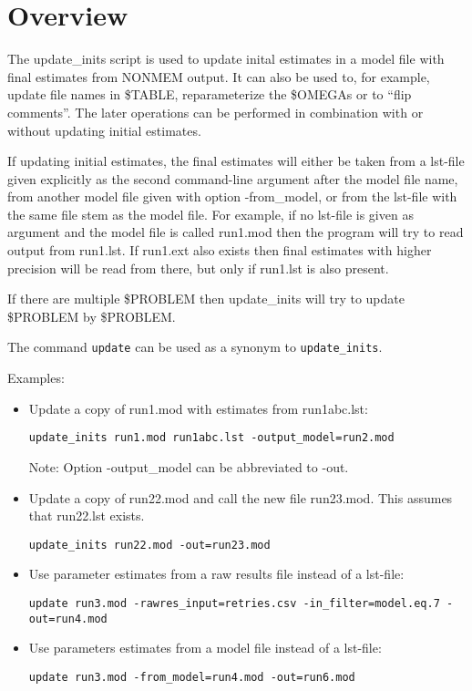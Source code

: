 
\setlength{\evensidemargin}{0pt}
\setlength{\oddsidemargin}{0pt}




\maketitle


\section{Overview}
The update\_inits script is used to update inital estimates in a model file with final
estimates from NONMEM output. It can also be used to, for example, update file names in \$TABLE, reparameterize
the \$OMEGAs or to ``flip comments''. The later operations can be performed in combination with 
or without updating initial estimates.

If updating initial estimates, the final estimates will either be taken from a lst-file given explicitly as the second 
command-line argument after the model file name, from another model file given with option -from\_model, 
or from the lst-file with the same file stem as the model file.
For example, if no lst-file is given as argument and the model file is called run1.mod then the program will try to read output from
run1.lst. If run1.ext also exists then final estimates with higher precision will be read from there, 
but only if run1.lst is also present.

If there are multiple \$PROBLEM then update\_inits will try to update \$PROBLEM by \$PROBLEM.

The command \verb|update| can be used as a synonym to \verb|update_inits|.

\noindent Examples:
\begin{itemize}
\item Update a copy of run1.mod with estimates from run1abc.lst:
\begin{verbatim}
update_inits run1.mod run1abc.lst -output_model=run2.mod
\end{verbatim}
Note: Option -output\_model can be abbreviated to -out.
\item Update a copy of run22.mod and call the new file run23.mod. This assumes that run22.lst exists.
\begin{verbatim}
update_inits run22.mod -out=run23.mod
\end{verbatim}
\item Use parameter estimates from a raw results file instead of a lst-file:
\begin{verbatim}
update run3.mod -rawres_input=retries.csv -in_filter=model.eq.7 -out=run4.mod
\end{verbatim}
\item Use parameters estimates from a model file instead of a lst-file:
\begin{verbatim}
update run3.mod -from_model=run4.mod -out=run6.mod
\end{verbatim}
\end{itemize}

